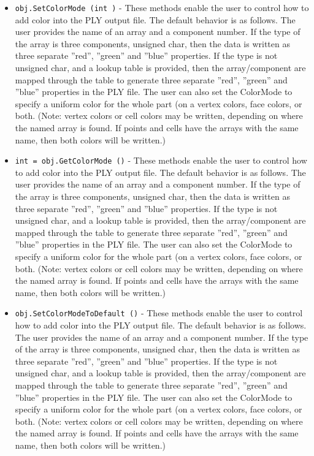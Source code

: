 \begin{itemize}
\item  \verb|obj.SetColorMode (int )| -  These methods enable the user to control how to add color into the PLY
 output file. The default behavior is as follows. The user provides the
 name of an array and a component number. If the type of the array is
 three components, unsigned char, then the data is written as three
 separate ''red'', ''green'' and ''blue'' properties. If the type is not
 unsigned char, and a lookup table is provided, then the array/component
 are mapped through the table to generate three separate ''red'', ''green''
 and ''blue'' properties in the PLY file. The user can also set the
 ColorMode to specify a uniform color for the whole part (on a vertex
 colors, face colors, or both. (Note: vertex colors or cell colors may be
 written, depending on where the named array is found. If points and
 cells have the arrays with the same name, then both colors will be
 written.)

\item  \verb|int = obj.GetColorMode ()| -  These methods enable the user to control how to add color into the PLY
 output file. The default behavior is as follows. The user provides the
 name of an array and a component number. If the type of the array is
 three components, unsigned char, then the data is written as three
 separate ''red'', ''green'' and ''blue'' properties. If the type is not
 unsigned char, and a lookup table is provided, then the array/component
 are mapped through the table to generate three separate ''red'', ''green''
 and ''blue'' properties in the PLY file. The user can also set the
 ColorMode to specify a uniform color for the whole part (on a vertex
 colors, face colors, or both. (Note: vertex colors or cell colors may be
 written, depending on where the named array is found. If points and
 cells have the arrays with the same name, then both colors will be
 written.)

\item  \verb|obj.SetColorModeToDefault ()| -  These methods enable the user to control how to add color into the PLY
 output file. The default behavior is as follows. The user provides the
 name of an array and a component number. If the type of the array is
 three components, unsigned char, then the data is written as three
 separate ''red'', ''green'' and ''blue'' properties. If the type is not
 unsigned char, and a lookup table is provided, then the array/component
 are mapped through the table to generate three separate ''red'', ''green''
 and ''blue'' properties in the PLY file. The user can also set the
 ColorMode to specify a uniform color for the whole part (on a vertex
 colors, face colors, or both. (Note: vertex colors or cell colors may be
 written, depending on where the named array is found. If points and
 cells have the arrays with the same name, then both colors will be
 written.)


\end{itemize}
